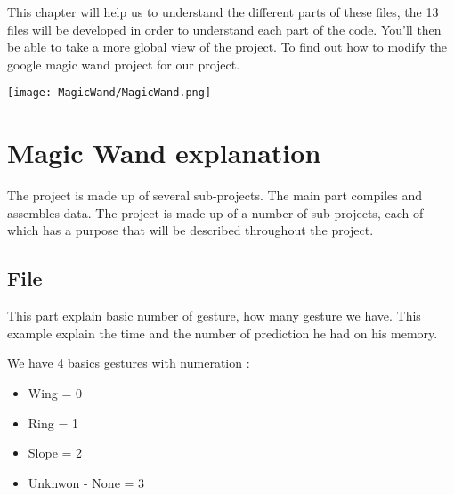 This chapter will help us to understand the different parts of these files, the 13 files will be developed in order to understand each part of the code. You'll then be able to take a more global view of the project. To find out how to modify the google magic wand project for our project. 

\begin{center}
    \texttt{[image: MagicWand/MagicWand.png]}
\end{center}



\section{Magic Wand explanation}
The project is made up of several sub-projects. The main part compiles and assembles data. The project is made up of a number of sub-projects, each of which has a purpose that will be described throughout the project. 

\begin{center}
    \label{Magic Wand Flow Lite General}
\end{center}


\subsection{File }

This part explain basic number of gesture, how many gesture we have. This example explain the time and the number  of prediction he had on his memory.  

\bigskip

We have 4 basics gestures with numeration : 

\begin{itemize}
    \item Wing = 0  
    \item Ring = 1
    \item Slope = 2
    \item Unknwon - None = 3	
\end{itemize} 

\begin{center}
    \label{MagicWandConstant}
\end{center}

